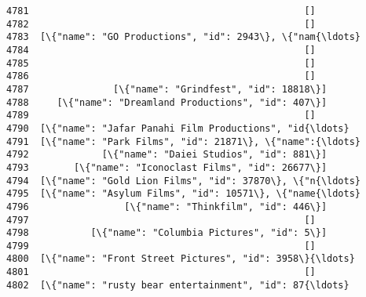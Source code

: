 \documentclass[11pt]{article}
\begin{document}
\begin{Verbatim}[commandchars=\\\{\}]
4781                                                 []   
4782                                                 []   
4783  [\{"name": "GO Productions", "id": 2943\}, \{"nam{\ldots}   
4784                                                 []   
4785                                                 []   
4786                                                 []   
4787               [\{"name": "Grindfest", "id": 18818\}]   
4788     [\{"name": "Dreamland Productions", "id": 407\}]   
4789                                                 []   
4790  [\{"name": "Jafar Panahi Film Productions", "id{\ldots}   
4791  [\{"name": "Park Films", "id": 21871\}, \{"name":{\ldots}   
4792             [\{"name": "Daiei Studios", "id": 881\}]   
4793        [\{"name": "Iconoclast Films", "id": 26677\}]   
4794  [\{"name": "Gold Lion Films", "id": 37870\}, \{"n{\ldots}   
4795  [\{"name": "Asylum Films", "id": 10571\}, \{"name{\ldots}   
4796                 [\{"name": "Thinkfilm", "id": 446\}]   
4797                                                 []   
4798           [\{"name": "Columbia Pictures", "id": 5\}]   
4799                                                 []   
4800  [\{"name": "Front Street Pictures", "id": 3958\}{\ldots}   
4801                                                 []   
4802  [\{"name": "rusty bear entertainment", "id": 87{\ldots}   


\end{Verbatim}
\end{document}
